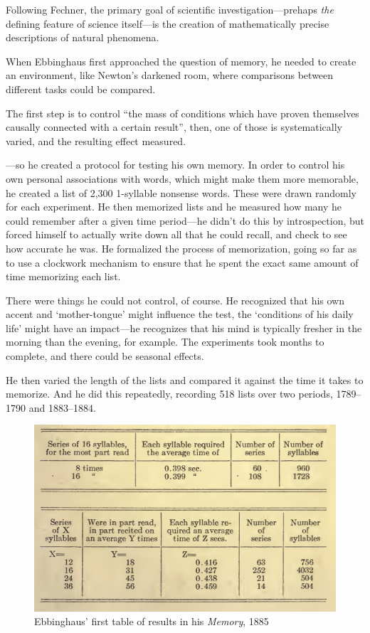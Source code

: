 \begin{refsection}
Following Fechner, the primary goal of scientific investigation---prehaps \emph{the} defining feature of science itself---is the creation of mathematically precise descriptions of natural phenomena. 

When Ebbinghaus first approached the question of memory, he needed to create an environment, like Newton’s darkened room, where comparisons between different tasks could be compared. 

The first step is to control “the mass of conditions which have proven themselves causally connected with a certain result”, then, one of those is systematically varied, and the resulting effect measured.

---so he created a protocol for testing his own memory. In order to control his own personal associations with words, which might make them more memorable, he created a list of 2,300 1-syllable nonsense words. These were drawn randomly for each experiment. He then memorized lists and he measured how many he could remember after a given time period---he didn’t do this by introspection, but forced himself to actually write down all that he could recall, and check to see how accurate he was. He formalized the process of memorization, going so far as to use a clockwork mechanism to ensure that he spent the exact same amount of time memorizing each list.

There were things he could not control, of course. He recognized that his own accent and ‘mother-tongue’ might influence the test, the ‘conditions of his daily life’ might have an impact---he recognizes that his mind is typically fresher in the morning than the evening, for example. The experiments took months to complete, and there could be seasonal effects. 

He then varied the length of the lists and compared it against the time it takes to memorize. And he did this repeatedly, recording 518 lists over two periods, 1789--1790 and 1883--1884.
\begin{figure}\includegraphics{../images/ebbinghaus1885.png}\caption{Ebbinghaus’ first table of results in his \emph{Memory}, 1885}\label{fig:ebbinghaus1}\end{figure}


\end{refsection}

